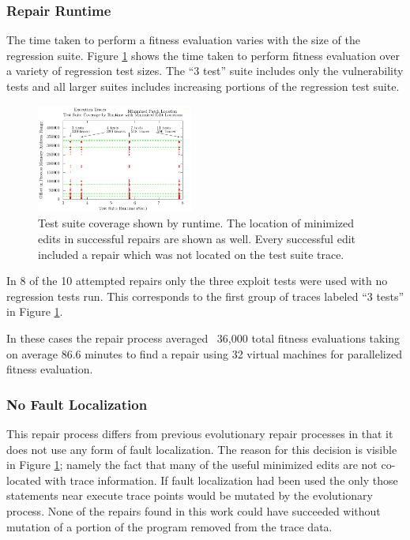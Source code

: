 \documentclass{sigcomm-alternate}
\begin{document}
\subsubsection{Repair Runtime}
\label{runtime}
The time taken to perform a fitness evaluation varies with the size of
the regression suite.  Figure \ref{ts-cov-rt-w-min} shows the time
taken to perform fitness evaluation over a variety of regression test
sizes.  The ``3 test'' suite includes only the vulnerability tests and
all larger suites includes increasing portions of the regression test
suite.

\begin{figure}[htb]
  \centering
  \includegraphics[width=0.46\textwidth]{ts-cov-and-runtime-w-min.pdf}  
  \caption{Test suite coverage shown by runtime.  The location of
    minimized edits in successful repairs are shown as well.  Every
    successful edit included a repair which was not located on the
    test suite trace.}
  \label{ts-cov-rt-w-min}
\end{figure}

In 8 of the 10 attempted repairs only the three exploit tests were
used with no regression tests run.  This corresponds to the first
group of traces labeled ``3 tests'' in Figure \ref{ts-cov-rt-w-min}.

In these cases the repair process averaged ~36,000 total fitness
evaluations taking on average 86.6 minutes to find a repair using 32
virtual machines for parallelized fitness evaluation.

\subsubsection{No Fault Localization}
\label{no-fault-localization}

This repair process differs from previous evolutionary repair
processes in that it does not use any form of fault localization.  The
reason for this decision is visible in Figure \ref{ts-cov-rt-w-min};
namely the fact that many of the useful minimized edits are not
co-located with trace information.  If fault localization had been
used the only those statements near execute trace points would be
mutated by the evolutionary process.  None of the repairs found in
this work could have succeeded without mutation of a portion of the
program removed from the trace data.
\end{document}
